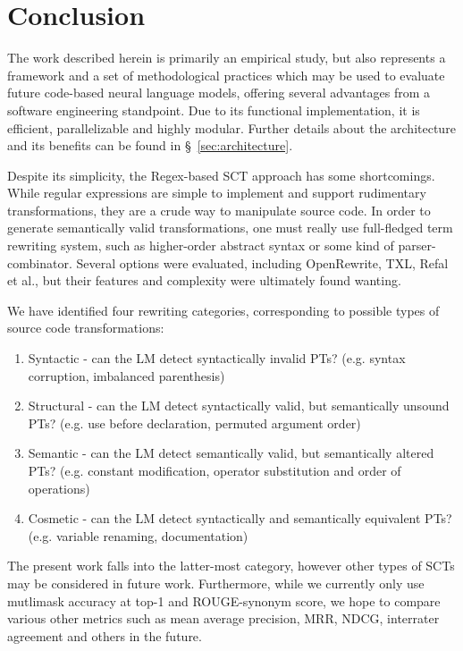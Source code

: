 \documentclass[sigconf,review,anonymous]{acmart}
\begin{document}
  \pagebreak
  \section{Conclusion}\label{sec:conclusion}

  The work described herein is primarily an empirical study, but also represents a framework and a set of methodological practices which may be used to evaluate future code-based neural language models, offering several advantages from a software engineering standpoint. Due to its functional implementation, it is efficient, parallelizable and highly modular. Further details about the architecture and its benefits can be found in \S~\ref{sec:architecture}.

  Despite its simplicity, the Regex-based SCT approach has some shortcomings. While regular expressions are simple to implement and support rudimentary transformations, they are a crude way to manipulate source code. In order to generate semantically valid transformations, one must really use full-fledged term rewriting system, such as higher-order abstract syntax or some kind of parser-combinator. Several options were evaluated, including OpenRewrite, TXL, Refal et al., but their features and complexity were ultimately found wanting.

  We have identified four rewriting categories, corresponding to possible types of source code transformations:

  \begin{enumerate}
    \item Syntactic - can the LM detect syntactically invalid PTs? (e.g. syntax corruption, imbalanced parenthesis)
    \item Structural - can the LM detect syntactically valid, but semantically unsound PTs? (e.g. use before declaration, permuted argument order)
    \item Semantic - can the LM detect semantically valid, but semantically altered PTs? (e.g. constant modification, operator substitution and order of operations)
    \item Cosmetic - can the LM detect syntactically and semantically equivalent PTs? (e.g. variable renaming, documentation)
  \end{enumerate}

  The present work falls into the latter-most category, however other types of SCTs may be considered in future work. Furthermore, while we currently only use mutlimask accuracy at top-1 and ROUGE-synonym score, we hope to compare various other metrics such as mean average precision, MRR, NDCG, interrater agreement and others in the future.
\end{document}
